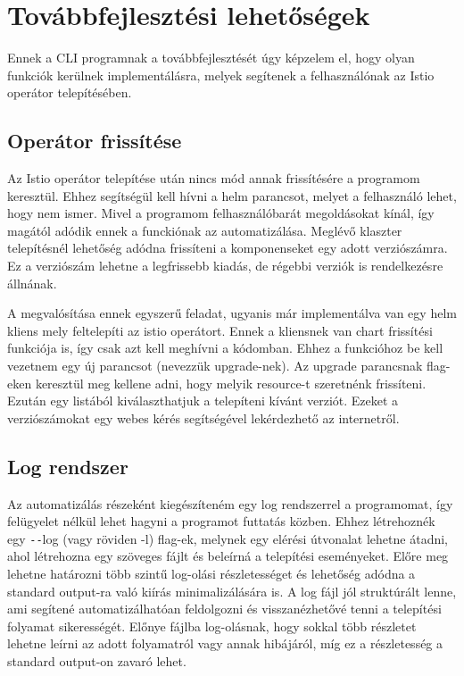 \section{Továbbfejlesztési lehetőségek}
Ennek a CLI programnak a továbbfejlesztését úgy képzelem el, hogy olyan funkciók kerülnek implementálásra, melyek segítenek a felhasználónak az Istio operátor telepítésében.

\subsection{Operátor frissítése}
Az Istio operátor telepítése után nincs mód annak frissítésére a programom keresztül.
Ehhez segítségül kell hívni a helm parancsot, melyet a felhasználó lehet, hogy nem ismer.
Mivel a programom felhasználóbarát megoldásokat kínál, így magától adódik ennek a funckiónak az automatizálása.
Meglévő klaszter telepítésnél lehetőség adódna frissíteni a komponenseket egy adott verziószámra.
Ez a verziószám lehetne a legfrissebb kiadás, de régebbi verziók is rendelkezésre állnának.

A megvalósítása ennek egyszerű feladat, ugyanis már implementálva van egy helm kliens mely feltelepíti az istio operátort.
Ennek a kliensnek van chart frissítési funkciója is, így csak azt kell meghívni a kódomban.
Ehhez a funkcióhoz be kell vezetnem egy új parancsot (nevezzük upgrade-nek).
Az upgrade parancsnak flag-eken keresztül meg kellene adni, hogy melyik resource-t szeretnénk frissíteni.
Ezután egy listából kiválaszthatjuk a telepíteni kívánt verziót. Ezeket a verziószámokat egy webes kérés segítségével lekérdezhető az internetről.

\subsection{Log rendszer}
Az automatizálás részeként kiegészíteném egy log rendszerrel a programomat, így felügyelet nélkül lehet hagyni a programot futtatás közben.
Ehhez létrehoznék egy \texttt{-{}-}log (vagy röviden -l) flag-ek, melynek egy elérési útvonalat lehetne átadni, ahol létrehozna egy szöveges fájlt és beleírná a telepítési eseményeket. Előre meg lehetne határozni több szintű log-olási részletességet és lehetőség adódna a standard output-ra való kiírás minimalizálására is.
A log fájl jól struktúrált lenne, ami segítené automatizálhatóan feldolgozni és visszanézhetővé tenni a telepítési folyamat sikerességét.
Előnye fájlba log-olásnak, hogy sokkal több részletet lehetne leírni az adott folyamatról vagy annak hibájáról, míg ez a részletesség a standard output-on zavaró lehet.


